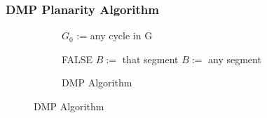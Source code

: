 \documentclass{beamer}
\begin{document}
    \frame
    {
        \frametitle{DMP Planarity Algorithm}
        \begin{figure}
            \centering
            \SetCustomAlgoRuledWidth{5.5cm}
            \tiny
            \begin{subfigure}[h]{5.5cm} 
                \begin{algorithm}[H]
                    \NoCaptionOfAlgo
                    \DontPrintSemicolon
                        $G_0$ := any cycle in G \;
                        
                        {
                            {
                                \Return FALSE \;
                            }
                            {
                                $B :=$ that segment \;
                            }
                            \Else
                            {
                                $B :=$ any segment \;
                            }
                        }
                    
                    \caption{\tiny DMP Algorithm}
                \end{algorithm}
            \end{subfigure}
        \end{figure}
        \vfill
    }
\end{document}
